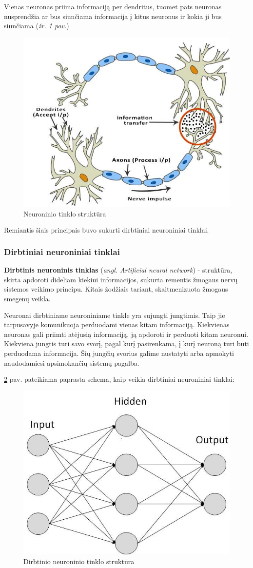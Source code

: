 \documentclass{VUMIFInfKursinis}
\begin{document}
Vienas neuronas priima informaciją per dendritus, tuomet pats neuronas nusprendžia ar bus siunčiama informacija į kitus neuronus ir kokia ji bus siunčiama (\textit{žr. \ref{img:neuron_structure} pav.})

\begin{figure}[H]
	\centering
	\includegraphics[width=.5\linewidth]{img/neuron-structure}
	\caption{Neuroninio tinklo struktūra \cite{RecurrentNeuralNetwork}}
	\label{img:neuron_structure}
\end{figure}


Remiantis šiais principais buvo sukurti dirbtiniai neuroniniai  tinklai.


\subsubsection{Dirbtiniai neuroniniai tinklai}
\textbf{Dirbtinis neuroninis tinklas} (\textit{angl. Artificial neural network}) - struktūra, skirta apdoroti dideliam kiekiui informacijos, sukurta rementis žmogaus nervų sistemos veikimo principu. Kitais žodžiais tariant, skaitmenizuota žmogaus smegenų veikla.

Neuronai dirbtiniame neuroniniame tinkle yra sujungti jungtimis. Taip jie tarpusavyje komunikuoja perduodami vienas kitam informaciją. Kiekvienas neuronas gali priimti atėjusią informaciją, ją apdoroti ir perduoti kitam neuronui. Kiekviena jungtis turi savo svorį, pagal kurį pasirenkama, į kurį neuroną turi būti perduodama informacija. Šių jungčių svorius galime nustatyti arba apmokyti naudodamiesi apsimokančių sistemų pagalba. 

\ref{img:ann} pav. pateikiama paprasta schema, kaip veikia dirbtiniai neuroniniai tinklai:

\begin{figure}[H]
	\centering
	\includegraphics[width=.4\linewidth]{img/ann}
	\caption{Dirbtinio neuroninio tinklo struktūra \cite{RecurrentNeuralNetwork}}
	\label{img:ann}
\end{figure}
\end{document}
